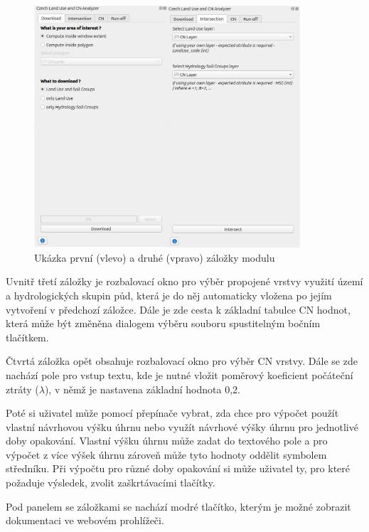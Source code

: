 \documentclass[a4paper,oneside,12pt]{book}
\begin{document}
\begin{figure}[H] \label{obr12a}
\centering
\includegraphics[height=9cm]{pictures/UI1.png}
\caption{Ukázka první (vlevo) a druhé (vpravo) záložky modulu }
\label{fig:UI1}
\end{figure}

\hspace{10mm} Uvnitř třetí záložky je rozbalovací okno pro výběr propojené vrstvy využití území a hydrologických skupin půd, která je do něj automaticky vložena po jejím vytvoření v předchozí záložce. Dále je zde cesta k základní tabulce CN hodnot, která může být změněna dialogem výběru souboru spustitelným bočním tlačítkem.

\hspace{10mm} Čtvrtá záložka opět obsahuje rozbalovací okno pro výběr CN vrstvy. Dále se zde nachází pole pro vstup textu, kde je nutné vložit poměrový koeficient počáteční ztráty ($\lambda$), v němž je nastavena základní hodnota 0,2.

\hspace{10mm} Poté si uživatel může pomocí přepínače vybrat, zda chce pro výpočet použít vlastní návrhovou výšku úhrnu nebo využít návrhové výšky úhrnu pro jednotlivé doby opakování. Vlastní výšku úhrnu může zadat do textového pole a pro výpočet z více výšek úhrnu zároveň může tyto hodnoty oddělit symbolem středníku. Při výpočtu pro různé doby opakování si může uživatel ty, pro které požaduje výsledek, zvolit zaškrtávacími tlačítky.

\hspace{10mm} Pod panelem se záložkami se nachází modré tlačítko, kterým je možné zobrazit dokumentaci ve webovém prohlížeči.
\end{document}
